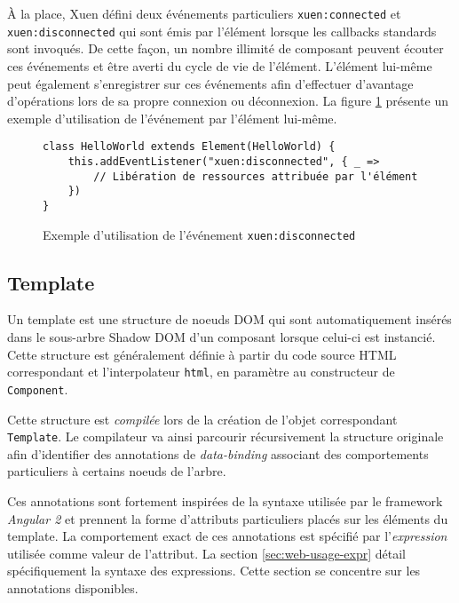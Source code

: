À la place, Xuen défini deux événements particuliers \texttt{xuen:connected} et \texttt{xuen:disconnected} qui sont émis par l'élément lorsque les callbacks standards sont invoqués. De cette façon, un nombre illimité de composant peuvent écouter ces événements et être averti du cycle de vie de l'élément. L'élément lui-même peut également s'enregistrer sur ces événements afin d'effectuer d'avantage d'opérations lors de sa propre connexion ou déconnexion. La figure \ref{fig:web-spec-event-disconnected} présente un exemple d'utilisation de l'événement par l'élément lui-même.

\begin{figure}[h]
	\begin{lstlisting}
class HelloWorld extends Element(HelloWorld) {
	this.addEventListener("xuen:disconnected", { _ =>
		// Libération de ressources attribuée par l'élément
	})
}
	\end{lstlisting}
	\caption{Exemple d'utilisation de l'événement \texttt{xuen:disconnected}}
	\label{fig:web-spec-event-disconnected}
\end{figure}

\subsection{Template} \label{sec:web-specs-template}

Un template est une structure de noeuds DOM qui sont automatiquement insérés dans le sous-arbre Shadow DOM d'un composant lorsque celui-ci est instancié. Cette structure est généralement définie à partir du code source HTML correspondant et l'interpolateur \texttt{html}, en paramètre au constructeur de \texttt{Component}.

Cette structure est \emph{compilée} lors de la création de l'objet correspondant \texttt{Template}. Le compilateur va ainsi parcourir récursivement la structure originale afin d'identifier des annotations de \emph{data-binding} associant des comportements particuliers à certains noeuds de l'arbre.

Ces annotations sont fortement inspirées de la syntaxe utilisée par le framework \emph{Angular 2} et prennent la forme d'attributs particuliers placés sur les éléments du template. La comportement exact de ces annotations est spécifié par l'\emph{expression} utilisée comme valeur de l'attribut. La section \ref{sec:web-usage-expr} détail spécifiquement la syntaxe des expressions. Cette section se concentre sur les annotations disponibles.

